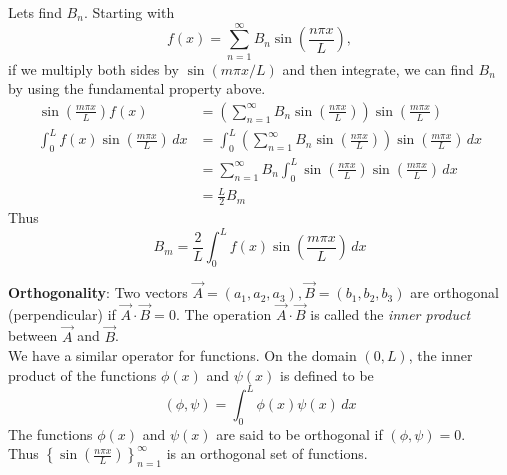 \documentclass{article}
\begin{document}
	Lets find $ B_n $. Starting with 
	\[
		f(x) = \sum\limits_{n=1}^{\infty} B_n \sin\left( \frac{n\pi x}{L} \right),
	\]
	if we multiply both sides by $ \sin(m\pi x/L) $ and then integrate, we can find $ B_n $ by using the fundamental property above.
	\begin{align*}
		\sin\left( \frac{m\pi x}{L} \right) f(x) &= \left( \sum\limits_{n=1}^{\infty} B_n \sin\left( \frac{n\pi x}{L} \right) \right) \sin\left( \frac{m\pi x}{L} \right) \\
		\int_0^L f(x) \sin\left( \frac{m\pi x}{L} \right) \, dx &= \int_0^L \left( \sum\limits_{n=1}^{\infty} B_n \sin\left( \frac{n\pi x}{L} \right) \right) \sin\left( \frac{m\pi x}{L} \right) \, dx \\
		&= \sum\limits_{n=1}^{\infty} B_n \int_0^L \sin\left( \frac{n\pi x}{L} \right) \sin\left( \frac{m\pi x}{L} \right) \, dx \\
		&= \frac{L}{2} B_m
	\end{align*}
	Thus
	\[
		B_m = \frac{2}{L} \int_0^L f(x) \sin\left( \frac{m\pi x}{L} \right) \, dx
	\]
	
	\textbf{Orthogonality}: Two vectors $ \vec{A} = (a_1,a_2,a_3), \vec{B} = (b_1,b_2,b_3) $ are orthogonal (perpendicular) if $ \vec{A} \cdot \vec{B} = 0 $. The operation $ \vec{A} \cdot \vec{B} $ is called the \textit{inner product} between $ \vec{A} $ and $ \vec{B} $. \\
	
	We have a similar operator for functions. On the domain $ (0,L) $, the inner product of the functions $ \phi(x) $ and $ \psi(x) $ is defined to be
	\[
		(\phi, \psi) = \int_0^L \phi(x) \psi(x) \, dx
	\]
	The functions $ \phi(x) $ and $ \psi(x) $ are said to be orthogonal if $ (\phi,\psi) = 0 $. \\
	
	Thus $ \left\{ \sin\left( \frac{n\pi x}{L} \right) \right\}_{n=1}^{\infty} $ is an orthogonal set of functions. \\
	
\end{document}
